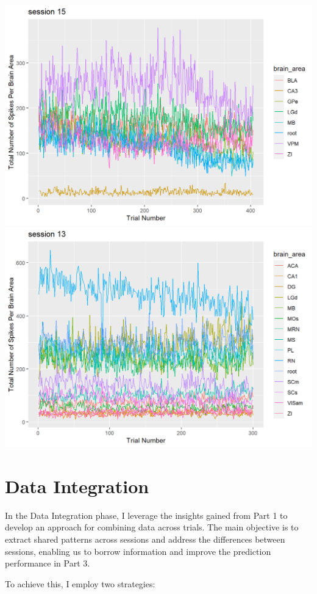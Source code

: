 \documentclass[
]{article}
\begin{document}
\includegraphics{images/unnamed-chunk-7-4.png}
\includegraphics{images/unnamed-chunk-7-5.png}

\section{Data Integration}\label{data-integration}

In the Data Integration phase, I leverage the insights gained from Part
1 to develop an approach for combining data across trials. The main
objective is to extract shared patterns across sessions and address the
differences between sessions, enabling us to borrow information and
improve the prediction performance in Part 3.

To achieve this, I employ two strategies:
\end{document}
